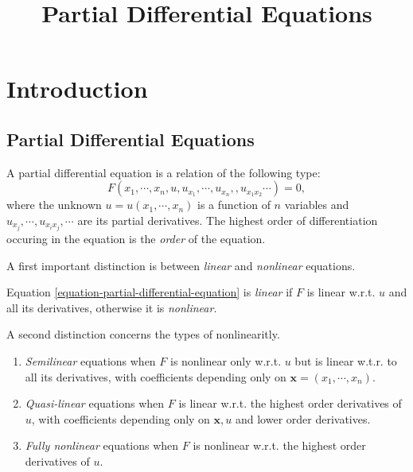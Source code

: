 

\title{Partial Differential Equations}
\label{chapter-partial-differential-equations}

\section{Introduction}
\label{section-introduction}

\subsection{Partial Differential Equations}
\label{subsection-introduction-partial-differential-equations}

\begin{definition}
  \label{definition-partial-differential-equation}
  \label{definition-order-of-differential-equation}
  A partial differential equation is a relation of the following type:
  \begin{equation}
    F(x_1, \cdots, x_n, u, u_{x_1}, \cdots, u_{x_n}, ,u_{x_1 x_2} \cdots) = 0, \label{equation-partial-differential-equation}
  \end{equation}
  where the unknown \( u = u(x_1, \cdots, x_n) \) is a function of \( n \) variables and \( u_{x_j}, \cdots, u_{x_i x_j}, \cdots \) are its partial derivatives.
  The highest order of differentiation occuring in the equation is the  \emph{order} of the equation.
\end{definition}
A first important distinction is between \emph{linear} and \emph{nonlinear} equations.
\begin{definition}
  \label{definition-linear-partial-differential-equation}
  \label{definition-nonlinear-partial-differential-equation}
  Equation \eqref{equation-partial-differential-equation} is \emph{linear} if \( F \) is linear w.r.t. \( u \) and all its derivatives, otherwise it is \emph{nonlinear}.
\end{definition}
A second distinction concerns the types of nonlinearitly.
\begin{definition}
  \label{definition-semilinear-partial-differential-equation}
  \label{definition-quasi-partial-differential-equation}
  \label{definition-fully-nonlinear-partial-differential-equation}
  \begin{enumerate}
    \item \emph{Semilinear} equations when \( F \) is nonlinear only w.r.t. \( u \) but is linear w.t.r. to all its derivatives, with coefficients depending only on \( \mathbf{x} = (x_1, \cdots, x_n) \).
    \item \emph{Quasi-linear} equations when \( F \) is linear w.r.t. the highest order derivatives of \( u \), with coefficients depending only on \( \mathbf{x}, u \) and lower order derivatives.
    \item \emph{Fully nonlinear} equations when \( F \) is nonlinear w.r.t. the highest order derivatives of \( u \).
  \end{enumerate}
\end{definition}

